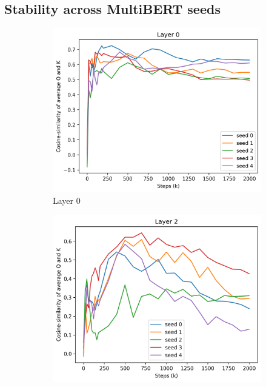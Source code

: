\begin{appendices}
\subsection{Stability across MultiBERT seeds}
\begin{figure}[ht]
    \centering
    \begin{subfigure}[b]{0.24\linewidth}
         \includegraphics[width=\linewidth]{sources/part_1/anisotropy/imgs/seeds_qk_l0.png}
         \caption{Layer 0}
         \label{fig:seeds_l0}
    \end{subfigure}
    \begin{subfigure}[b]{0.24\linewidth}
         \includegraphics[width=\linewidth]{sources/part_1/anisotropy/imgs/seeds_qk_l2.png}

\end{subfigure}
\end{figure}
\end{appendices}
